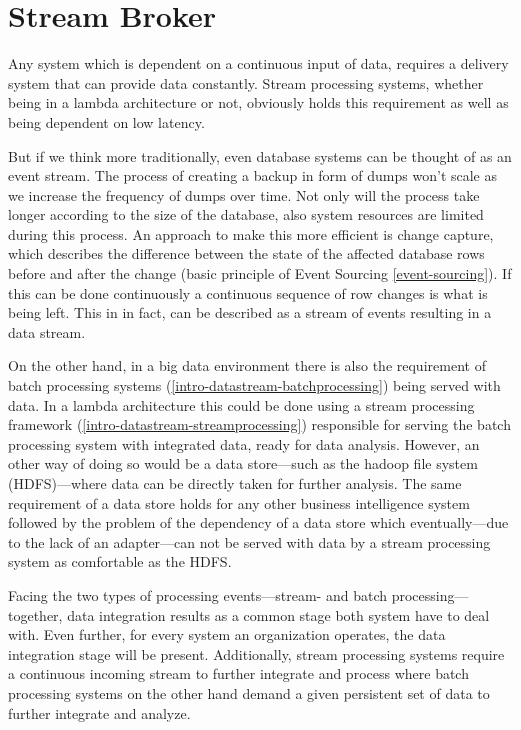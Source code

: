 \section{Stream Broker}
Any system which is dependent on a continuous input of data, requires a delivery
system that can provide data constantly. Stream processing
systems, whether being in a lambda architecture or not, obviously holds this requirement
as well as being dependent on low latency.

But if we think more traditionally, even database systems can be thought of as
an event stream. The process of creating a backup in form of dumps won't scale as
we increase the frequency of dumps over time. Not only will the process take
longer according to the size of the database, also system resources are limited
during this process. An approach to make this more efficient is change
capture, which describes the difference between the state of the affected database
rows before and after the change (basic principle of Event Sourcing
\ref{event-sourcing}). If this can be done continuously a continuous
sequence of row changes is what is being left. This in in fact, can be described 
as a stream of events resulting in a data stream.

On the other hand, in a big data environment there is also the requirement of
batch processing systems (\ref{intro-datastream-batchprocessing}) being served
with data. In a lambda architecture this could be done using a stream
processing framework (\ref{intro-datastream-streamprocessing}) responsible for
serving the batch processing system with integrated data, ready for data
analysis. However, an other way of doing so would be a data store---such as the
hadoop file system (HDFS)---where data can be directly taken for further analysis.
The same requirement of a data store holds for any other business intelligence
system followed by the problem of the dependency of a data store which
eventually---due to the lack of an adapter---can not be served with data by a
stream processing system as comfortable as the HDFS.

Facing the two types of processing events---stream- and batch
processing---together, data integration results as a common stage both system have to
deal with. Even further, for every system an organization operates, the data
integration stage will be present. 
Additionally, stream processing systems require a continuous
incoming stream to further integrate and process where batch processing systems
on the other hand demand a given persistent set of data to further integrate and analyze.

